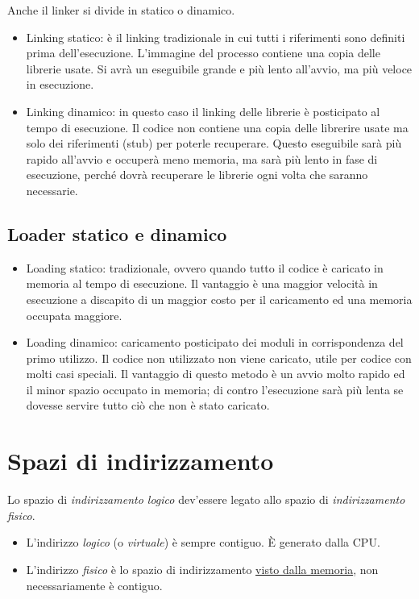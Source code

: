\documentclass[a4paper,12pt, twoside]{report}
\begin{document}
Anche il linker si divide in statico o dinamico.

\begin{itemize}
    \item Linking statico: \`e il linking tradizionale in cui tutti i riferimenti sono
        definiti prima dell'esecuzione. L'immagine del processo contiene una copia delle
        librerie usate. Si avr\`a un eseguibile grande e pi\`u lento all'avvio, ma pi\`u 
        veloce in esecuzione. 
    \item Linking dinamico: in questo caso il linking delle librerie \`e posticipato al 
        tempo di esecuzione. Il codice non contiene una copia delle librerire usate ma 
        solo dei riferimenti (stub) per poterle recuperare. Questo eseguibile sar\`a 
        pi\`u rapido all'avvio e occuper\`a meno memoria, ma sar\`a pi\`u lento in 
        fase di esecuzione, perch\'e dovr\`a recuperare le librerie ogni volta che
        saranno necessarie.
\end{itemize}

\subsection{Loader statico e dinamico}

\begin{itemize}
    \item Loading statico: tradizionale, ovvero quando tutto il codice \`e caricato in 
        memoria al tempo di esecuzione. Il vantaggio \`e una maggior velocit\`a in 
        esecuzione a discapito di un maggior costo per il caricamento ed una memoria 
        occupata maggiore.
    \item Loading dinamico: caricamento posticipato dei moduli in corrispondenza del primo 
        utilizzo. Il codice non utilizzato non viene caricato, utile per codice con molti 
        casi speciali. Il vantaggio di questo metodo \`e un avvio molto rapido ed il minor 
        spazio occupato in memoria; di contro l'esecuzione sar\`a pi\`u lenta se dovesse 
        servire tutto ci\`o che non \`e stato caricato.
\end{itemize}

\section{Spazi di indirizzamento}

Lo spazio di \emph{indirizzamento logico} dev'essere legato allo spazio di 
\emph{indirizzamento fisico}.
\begin{itemize}
\item L'indirizzo \emph{logico} (o \emph{virtuale}) \`e sempre contiguo.  \`E generato dalla CPU. 
\item L'indirizzo \emph{fisico} \`e lo spazio di indirizzamento \underline{visto dalla memoria}, non necessariamente \`e contiguo.
\end{itemize}
\end{document}

